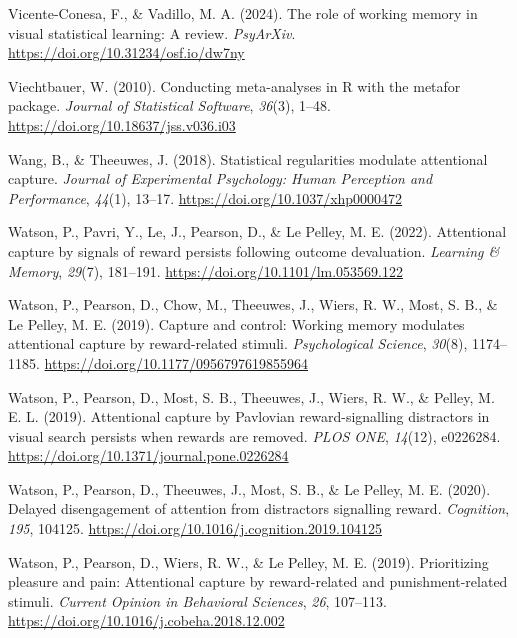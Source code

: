 \documentclass[
  man,
  floatsintext,
  longtable,
  nolmodern,
  notxfonts,
  notimes,
  mask,
  colorlinks=true,linkcolor=blue,citecolor=blue,urlcolor=blue]{apa7}
\newlength{\cslhangindent}
\newenvironment{CSLReferences}[2] %
 {\begin{list}{}{%
  \setlength{\itemindent}{0pt}
  \setlength{\leftmargin}{0pt}
  \setlength{\parsep}{0pt}
  \ifodd #1
   \setlength{\leftmargin}{\cslhangindent}
   \setlength{\itemindent}{-1\cslhangindent}
  \fi
  \setlength{\itemsep}{#2\baselineskip}}}
 {\end{list}}
\begin{document}
\begin{CSLReferences}{1}{0}
Vicente-Conesa, F., \& Vadillo, M. A. (2024). The role of working memory
in visual statistical learning: A review. \emph{PsyArXiv}.
\url{https://doi.org/10.31234/osf.io/dw7ny}

Viechtbauer, W. (2010). Conducting meta-analyses in {R} with the
{metafor} package. \emph{Journal of Statistical Software}, \emph{36}(3),
1--48. \url{https://doi.org/10.18637/jss.v036.i03}

Wang, B., \& Theeuwes, J. (2018). Statistical regularities modulate
attentional capture. \emph{Journal of Experimental Psychology: Human
Perception and Performance}, \emph{44}(1), 13--17.
\url{https://doi.org/10.1037/xhp0000472}

Watson, P., Pavri, Y., Le, J., Pearson, D., \& Le Pelley, M. E. (2022).
Attentional capture by signals of reward persists following outcome
devaluation. \emph{Learning \& Memory}, \emph{29}(7), 181--191.
\url{https://doi.org/10.1101/lm.053569.122}

Watson, P., Pearson, D., Chow, M., Theeuwes, J., Wiers, R. W., Most, S.
B., \& Le Pelley, M. E. (2019). Capture and control: Working memory
modulates attentional capture by reward-related stimuli.
\emph{Psychological Science}, \emph{30}(8), 1174--1185.
\url{https://doi.org/10.1177/0956797619855964}

Watson, P., Pearson, D., Most, S. B., Theeuwes, J., Wiers, R. W., \&
Pelley, M. E. L. (2019). Attentional capture by Pavlovian
reward-signalling distractors in visual search persists when rewards are
removed. \emph{PLOS ONE}, \emph{14}(12), e0226284.
\url{https://doi.org/10.1371/journal.pone.0226284}

Watson, P., Pearson, D., Theeuwes, J., Most, S. B., \& Le Pelley, M. E.
(2020). Delayed disengagement of attention from distractors signalling
reward. \emph{Cognition}, \emph{195}, 104125.
\url{https://doi.org/10.1016/j.cognition.2019.104125}

Watson, P., Pearson, D., Wiers, R. W., \& Le Pelley, M. E. (2019).
Prioritizing pleasure and pain: Attentional capture by reward-related
and punishment-related stimuli. \emph{Current Opinion in Behavioral
Sciences}, \emph{26}, 107--113.
\url{https://doi.org/10.1016/j.cobeha.2018.12.002}


\end{CSLReferences}
\end{document}
